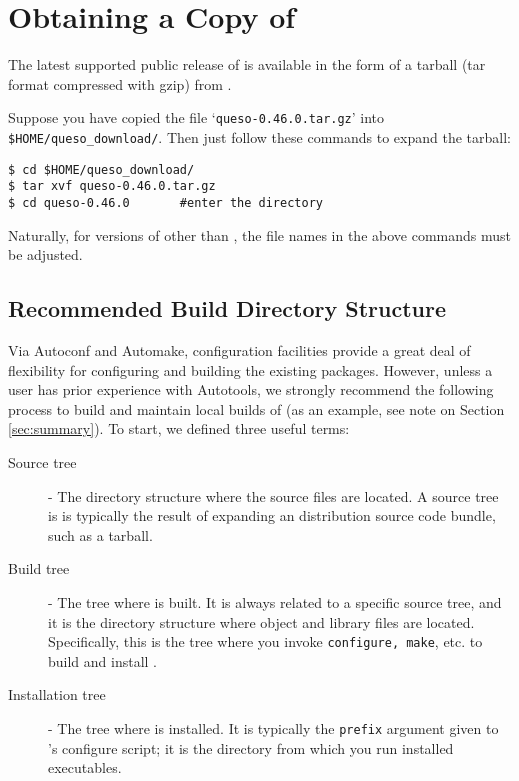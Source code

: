 \section{Obtaining a Copy of \Queso{}}

The latest supported public release of \Queso{} is available in the form of a tarball (tar format compressed with gzip) from \Quesoweb{}.

Suppose you have copied the file `\verb+queso-0.46.0.tar.gz+' into \texttt{\$HOME/queso\_download/}.
Then just follow these commands to expand the tarball:
\begin{lstlisting}
$ cd $HOME/queso_download/
$ tar xvf queso-0.46.0.tar.gz
$ cd queso-0.46.0   	#enter the directory 
\end{lstlisting}

Naturally, for versions of \Queso{} other than \QUESOversion, the file names in the above commands must be adjusted.


\subsection{Recommended Build Directory Structure}\label{sec:Queso_tree}

Via Autoconf and Automake, \Queso{} configuration facilities provide a great deal 
of flexibility for configuring and building the existing \Queso{} packages. However,
unless a user has prior experience with Autotools, we strongly recommend
the following process to build and maintain local builds of \Queso{} (as an example, see note on Section \ref{sec:summary}).
To start, we defined three useful terms:

\begin{description}
 \item [Source tree] - The directory structure where the \Queso{} source files are located. A source
tree is is typically the result of expanding an \Queso{} distribution source code bundle, such as a tarball.%
 \item [Build tree] %
- The tree where \Queso{} is built. It is always related to a specific source tree, and it is the directory structure where object and library files are located. Specifically, this is the tree where you invoke \texttt{configure, make}, etc. to build and install \Queso{}. 
 \item [Installation tree] - The tree where \Queso{} is installed. It is typically the \texttt{prefix} argument given to \Queso{}'s configure script; it is the directory from which you run installed \Queso{} executables.
\end{description}


